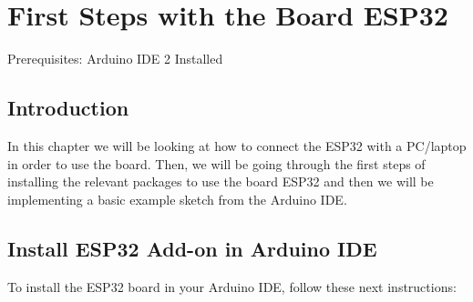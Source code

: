 %
%


\chapter{First Steps with the Board ESP32}

Prerequisites: Arduino IDE 2 Installed

\section{Introduction}

In this chapter we will be looking at how to connect the ESP32 with a PC/laptop  in order to use the board. Then, we will be going through the first steps of installing the relevant packages to use the board ESP32 and then we will be implementing a basic example sketch from the Arduino IDE.



\section{Install ESP32 Add-on in Arduino IDE}




To install the ESP32 board in your Arduino IDE, follow these next instructions:

